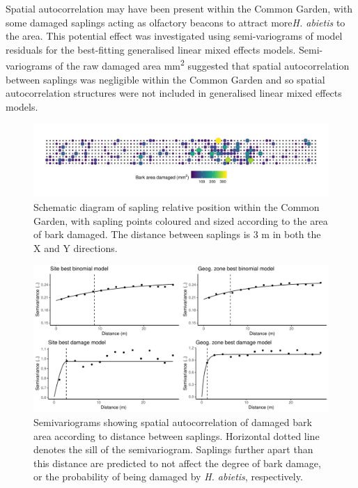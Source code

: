 \documentclass[a4paper, 11pt]{article}
\begin{document}
Spatial autocorrelation may have been present within the Common Garden, with some damaged saplings acting as olfactory beacons to attract more\textit{H. abietis} to the area. This potential effect was investigated using semi-variograms of model residuals for the best-fitting generalised linear mixed effects models. Semi-variograms of the raw damaged area mm\textsuperscript{2} suggested that spatial autocorrelation between saplings was negligible within the Common Garden and so spatial autocorrelation structures were not included in generalised linear mixed effects models.

\begin{figure}[H]
	\includegraphics[width=\textwidth]{sapling_map}
	\caption{Schematic diagram of sapling relative position within the Common Garden, with sapling points coloured and sized according to the area of bark damaged. The distance between saplings is 3 m in both the X and Y directions.}
	\label{sapling_map}
\end{figure}

\begin{figure}[H]
	\includegraphics[width=\textwidth]{semivariogram_all}
	\caption{Semivariograms showing spatial autocorrelation of damaged bark area according to distance between saplings. Horizontal dotted line denotes the sill of the semivariogram. Saplings further apart than this distance are predicted to not affect the degree of bark damage, or the probability of being damaged by \textit{H. abietis}, respectively.}
	\label{semivariogram}
\end{figure}
\end{document}
